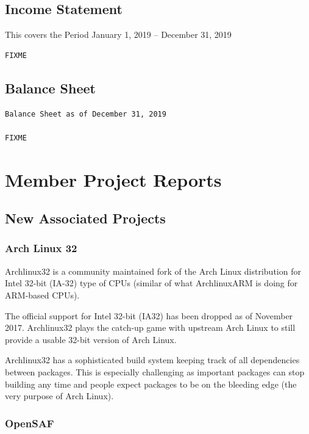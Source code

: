\documentclass[a4paper]{report}
\begin{document}
\section{Income Statement}

This covers the Period January 1, 2019 -- December 31, 2019

\begin{verbatim}
FIXME
\end{verbatim}

\section{Balance Sheet}

\begin{verbatim}
Balance Sheet as of December 31, 2019

FIXME
\end{verbatim}

\chapter{Member Project Reports}

\section{New Associated Projects}

\subsection{Arch Linux 32}

Archlinux32 is a community maintained fork of the Arch Linux
distribution for Intel 32-bit (IA-32) type of CPUs (similar of what
ArchlinuxARM is doing for ARM-based CPUs).

The official support for Intel 32-bit (IA32) has been dropped as of
November 2017.  Archlinux32 plays the catch-up game with upstream Arch
Linux to still provide a usable 32-bit version of Arch Linux.

Archlinux32 has a sophisticated build system keeping track of all
dependencies between packages.  This is especially challenging as
important packages can stop building any time and people expect packages
to be on the bleeding edge (the very purpose of Arch Linux).

\subsection{OpenSAF}
\end{document}
